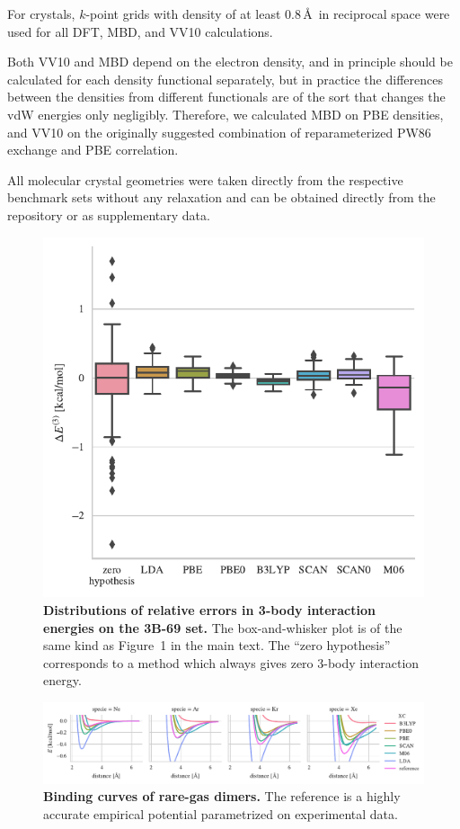 \documentclass[twocolumn]{article}
\begin{document}
For crystals, $k$-point grids with density of at least 0.8\,\AA\ in reciprocal space were used for all DFT, MBD, and VV10 calculations.

Both VV10 and MBD depend on the electron density, and in principle should be calculated for each density functional separately, but in practice the differences between the densities from different functionals are of the sort that changes the vdW energies only negligibly.
Therefore, we calculated MBD on PBE densities, and VV10 on the originally suggested combination of reparameterized PW86 exchange and PBE correlation.

All molecular crystal geometries were taken directly from the respective benchmark sets without any relaxation and can be obtained directly from the repository or as supplementary data.

\begin{figure}
\includegraphics[center]{../media/3-body}
\caption{\textbf{Distributions of relative errors in 3-body interaction energies on the 3B-69 set.}
The box-and-whisker plot is of the same kind as Figure~1 in the main text.
The ``zero hypothesis'' corresponds to a method which always gives zero 3-body interaction energy.
}\label{fig:3-body}
\end{figure}

\begin{figure}
\includegraphics[center]{../media/mbd-rare-gas}
\caption{\textbf{Binding curves of rare-gas dimers.}
The reference is a highly accurate empirical potential parametrized on experimental data.
}\label{fig:mbd-rare-gas}
\end{figure}
\end{document}
